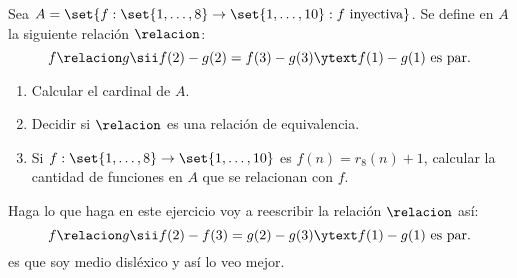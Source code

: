 \begin{enunciado}{\ejExtra}
  Sea $A = \set{f : \set{1, \ldots, 8} \to \set{1,\ldots, 10} : f \text{ inyectiva}}$. Se define en $A$ la siguiente
  relación $\relacion$:
  $$
    f \relacion g \sii f(2) - g(2) = f(3) - g(3) \ytext f(1) - g(1) \text{ es par}.
  $$
  \begin{enumerate}[label=(\alph*)]
    \item Calcular el cardinal de $A$.
    \item Decidir si $\relacion$ es una relación de equivalencia.
    \item Si $f : \set{1,\ldots, 8} \to \set{1, \ldots, 10}$ es $f(n) = r_8(n) + 1$, calcular la cantidad de funciones en $A$
          que se relacionan con $f$.
  \end{enumerate}
\end{enunciado}
Haga lo que haga en este ejercicio voy a reescribir la relación $\relacion$ así:
$$
  f \relacion g \sii f(2) - f(3) = g(2) - g(3) \ytext f(1) - g(1) \text{ es par}.
$$
es que soy medio disléxico y así lo veo mejor.

